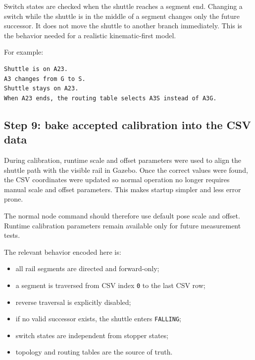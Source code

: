 \documentclass[12pt,a4paper]{report}
\newcommand{\codenext}[1]{\par\Needspace{#1\baselineskip}}
\begin{document}
Switch states are checked when the shuttle reaches a segment end. Changing a
switch while the shuttle is in the middle of a segment changes only the future
successor. It does not move the shuttle to another branch immediately. This is
the behavior needed for a realistic kinematic-first model.

For example:

\begin{lstlisting}[style=terminalcode]
Shuttle is on A23.
A3 changes from G to S.
Shuttle stays on A23.
When A23 ends, the routing table selects A3S instead of A3G.
\end{lstlisting}

\subsection*{Step 9: bake accepted calibration into the CSV data}

During calibration, runtime scale and offset parameters were used to align the
shuttle path with the visible rail in Gazebo. Once the correct values were
found, the CSV coordinates were updated so normal operation no longer requires
manual scale and offset parameters. This makes startup simpler and less error
prone.

The normal node command should therefore use default pose scale and offset.
Runtime calibration parameters remain available only for future measurement
tests.

\codenext{22}


The relevant behavior encoded here is:

\begin{itemize}
\item all rail segments are directed and forward-only;
\item a segment is traversed from CSV index \texttt{0} to the last CSV row;
\item reverse traversal is explicitly disabled;
\item if no valid successor exists, the shuttle enters \texttt{FALLING};
\item switch states are independent from stopper states;
\item topology and routing tables are the source of truth.
\end{itemize}
\end{document}
